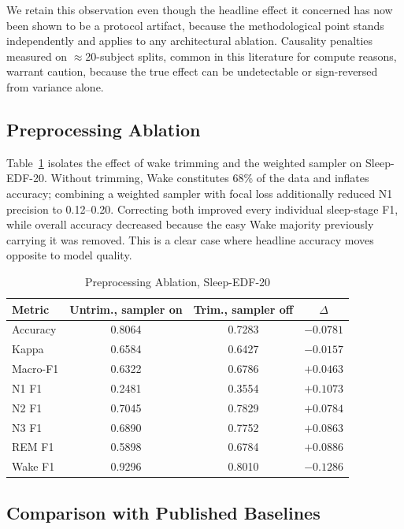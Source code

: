 \documentclass[conference]{IEEEtran}
\begin{document}
We retain this observation even though the headline effect it concerned has now been shown to be a
protocol artifact, because the methodological point stands independently and applies to any architectural
ablation. Causality penalties measured on $\approx$20-subject splits, common in this literature for
compute reasons, warrant caution, because the true effect can be undetectable or sign-reversed from
variance alone.

\subsection{Preprocessing Ablation}
\label{sec:preproc-ablation}

Table~\ref{tab:preproc} isolates the effect of wake trimming and the weighted sampler on Sleep-EDF-20.
Without trimming, Wake constitutes 68\% of the data and inflates accuracy; combining a weighted sampler
with focal loss additionally reduced N1 precision to 0.12--0.20. Correcting both improved every individual
sleep-stage F1, while overall accuracy decreased because the easy Wake majority previously carrying it was
removed. This is a clear case where headline accuracy moves opposite to model quality.

\begin{table}[t]
\caption{Preprocessing Ablation, Sleep-EDF-20}
\label{tab:preproc}
\centering
\begin{tabular}{lccc}
\toprule
Metric & Untrim., sampler on & Trim., sampler off & $\Delta$ \\
\midrule
Accuracy & 0.8064 & 0.7283 & $-0.0781$ \\
Kappa    & 0.6584 & 0.6427 & $-0.0157$ \\
Macro-F1 & 0.6322 & 0.6786 & $+0.0463$ \\
N1 F1    & 0.2481 & 0.3554 & $+0.1073$ \\
N2 F1    & 0.7045 & 0.7829 & $+0.0784$ \\
N3 F1    & 0.6890 & 0.7752 & $+0.0863$ \\
REM F1   & 0.5898 & 0.6784 & $+0.0886$ \\
Wake F1  & 0.9296 & 0.8010 & $-0.1286$ \\
\bottomrule
\end{tabular}
\end{table}

\subsection{Comparison with Published Baselines}
\label{sec:baselines}
\end{document}
